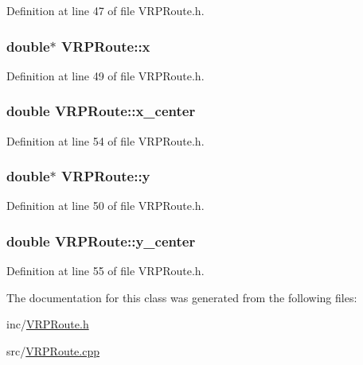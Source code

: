 Definition at line 47 of file VRPRoute.h.

\hypertarget{class_v_r_p_route_a8333174eb6fd26842408eca57b3e29c7}{
\subsubsection[{x}]{\setlength{\rightskip}{0pt plus 5cm}double$\ast$ {\bf VRPRoute::x}}}
\label{class_v_r_p_route_a8333174eb6fd26842408eca57b3e29c7}


Definition at line 49 of file VRPRoute.h.

\hypertarget{class_v_r_p_route_a0b775a2c29bcd2f7b254befac3d9505c}{
\subsubsection[{x\_\-center}]{\setlength{\rightskip}{0pt plus 5cm}double {\bf VRPRoute::x\_\-center}}}
\label{class_v_r_p_route_a0b775a2c29bcd2f7b254befac3d9505c}


Definition at line 54 of file VRPRoute.h.

\hypertarget{class_v_r_p_route_a10340585ced0af5cfc11784f628ea65c}{
\subsubsection[{y}]{\setlength{\rightskip}{0pt plus 5cm}double$\ast$ {\bf VRPRoute::y}}}
\label{class_v_r_p_route_a10340585ced0af5cfc11784f628ea65c}


Definition at line 50 of file VRPRoute.h.

\hypertarget{class_v_r_p_route_ab4a1b843875b5bee390153e1d0970e2b}{
\subsubsection[{y\_\-center}]{\setlength{\rightskip}{0pt plus 5cm}double {\bf VRPRoute::y\_\-center}}}
\label{class_v_r_p_route_ab4a1b843875b5bee390153e1d0970e2b}


Definition at line 55 of file VRPRoute.h.



The documentation for this class was generated from the following files:\begin{DoxyCompactItemize}
\item 
inc/\hyperlink{_v_r_p_route_8h}{VRPRoute.h}\item 
src/\hyperlink{_v_r_p_route_8cpp}{VRPRoute.cpp}\end{DoxyCompactItemize}
